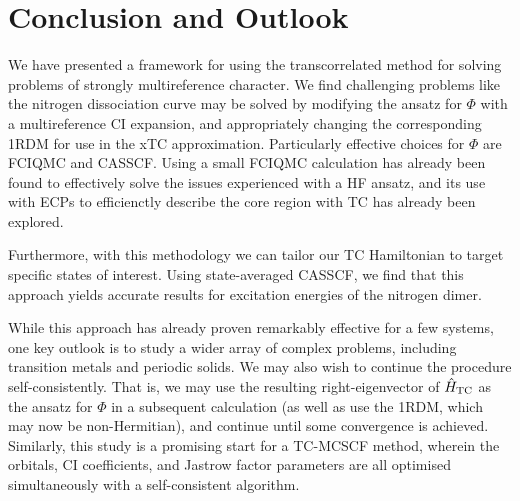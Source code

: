 \section{Conclusion and Outlook}

We have presented a framework for using the transcorrelated method for solving problems of strongly multireference character. We find challenging problems like the nitrogen dissociation curve may be solved by modifying the ansatz for $\Phi$ with a multireference CI expansion, and appropriately changing the corresponding 1RDM for use in the xTC approximation. Particularly effective choices for $\Phi$ are FCIQMC and CASSCF. Using a small FCIQMC calculation has already been found to effectively solve the issues experienced with a HF ansatz, and its use with \glspl{ECP} to efficienctly describe the core region with TC has already been explored.\supercite{simulaEcp}

Furthermore, with this methodology we can tailor our TC Hamiltonian to target specific states of interest. Using state-averaged CASSCF, we find that this approach yields accurate results for excitation energies of the nitrogen dimer.

While this approach has already proven remarkably effective for a few systems, one key outlook is to study a wider array of complex problems, including transition metals and periodic solids. We may also wish to continue the procedure self-consistently. That is, we may use the resulting right-eigenvector of $\hat H_\mathrm{TC}$ as the ansatz for $\Phi$ in a subsequent calculation (as well as use the 1RDM, which may now be non-Hermitian), and continue until some convergence is achieved. Similarly, this study is a promising start for a \gls{TC}-\gls{MCSCF} method, wherein the orbitals, CI coefficients, and Jastrow factor parameters are all optimised simultaneously with a self-consistent algorithm.

